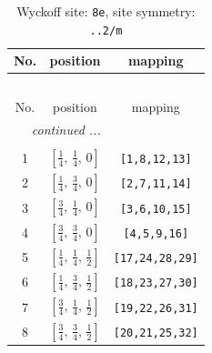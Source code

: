 \documentclass[fleqn,8pt]{jsarticle}
\begin{document}
\renewcommand{\arraystretch}{1.2}
\begin{longtable}{ccc}
\caption{Wyckoff site: {\tt 8e}, site symmetry: {\tt ..2/m}}
 \\
 \hline \hline
No. & position & mapping \\ \hline \endfirsthead

\multicolumn{2}{l}{\tablename\ \thetable{}} \\
 \hline \hline
No. & position & mapping \\ \hline \endhead

 \hline \hline
\multicolumn{2}{r}{\footnotesize\it continued ...} \\ \endfoot

 \hline \hline
\multicolumn{2}{r}{} \\ \endlastfoot

1 & $\left[ \frac{1}{4},\, \frac{1}{4},\, 0 \right]$ & {\tt [1,8,12,13]} \\ \hline
2 & $\left[ \frac{1}{4},\, \frac{3}{4},\, 0 \right]$ & {\tt [2,7,11,14]} \\ \hline
3 & $\left[ \frac{3}{4},\, \frac{1}{4},\, 0 \right]$ & {\tt [3,6,10,15]} \\ \hline
4 & $\left[ \frac{3}{4},\, \frac{3}{4},\, 0 \right]$ & {\tt [4,5,9,16]} \\ \hline
5 & $\left[ \frac{1}{4},\, \frac{1}{4},\, \frac{1}{2} \right]$ & {\tt [17,24,28,29]} \\ \hline
6 & $\left[ \frac{1}{4},\, \frac{3}{4},\, \frac{1}{2} \right]$ & {\tt [18,23,27,30]} \\ \hline
7 & $\left[ \frac{3}{4},\, \frac{1}{4},\, \frac{1}{2} \right]$ & {\tt [19,22,26,31]} \\ \hline
8 & $\left[ \frac{3}{4},\, \frac{3}{4},\, \frac{1}{2} \right]$ & {\tt [20,21,25,32]} \\
\end{longtable}
\renewcommand{\arraystretch}{1.2}
\end{document}
